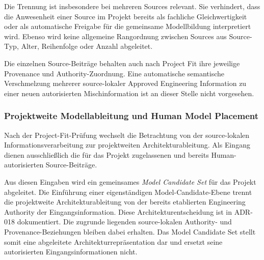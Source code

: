 Die Trennung ist insbesondere bei mehreren Sources relevant. Sie verhindert,
dass die Anwesenheit einer Source im Projekt bereits als fachliche
Gleichwertigkeit oder als automatische Freigabe für die gemeinsame
Modellbildung interpretiert wird. Ebenso wird keine allgemeine Rangordnung
zwischen Sources aus Source-Typ, Alter, Reihenfolge oder Anzahl abgeleitet.

Die einzelnen Source-Beiträge behalten auch nach Project Fit ihre jeweilige
Provenance und Authority-Zuordnung. Eine automatische semantische Verschmelzung
mehrerer source-lokaler Approved Engineering Information zu einer neuen
autorisierten Mischinformation ist an dieser Stelle nicht vorgesehen.

%
%
%
%


\subsubsection{Projektweite Modellableitung und Human Model Placement}
\label{sec:project_model_derivation}

Nach der Project-Fit-Prüfung wechselt die Betrachtung von der source-lokalen
Informationsverarbeitung zur projektweiten Architekturableitung. Als Eingang
dienen ausschließlich die für das Projekt zugelassenen und bereits
Human-autorisierten Source-Beiträge.

Aus diesen Eingaben wird ein gemeinsames \emph{Model Candidate Set} für das
Projekt abgeleitet. Die Einführung einer eigenständigen Model-Candidate-Ebene trennt die
projektweite Architekturableitung von der bereits etablierten
Engineering Authority der Eingangsinformation. Diese Architekturentscheidung
ist in ADR-018 dokumentiert. Die zugrunde liegenden source-lokalen Authority- und
Provenance-Beziehungen bleiben dabei erhalten. Das Model Candidate Set stellt
somit eine abgeleitete Architekturrepräsentation dar und ersetzt seine
autorisierten Eingangsinformationen nicht.

